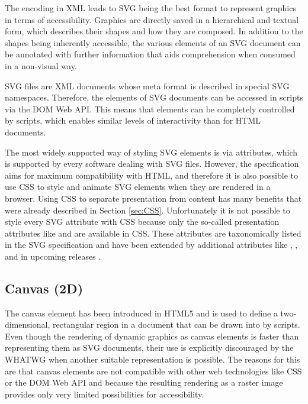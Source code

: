 The encoding in XML leads to SVG being the best format to represent graphics in terms of accessibility. 
Graphics are directly saved in a hierarchical and textual form, which describes their shapes and how they are composed. 
In addition to the shapes being inherently accessible, the various elements of an SVG document can be annotated with further information that aids comprehension when consumed in a non-visual way.

SVG files are XML documents whose meta format is described in special SVG namespaces. 
Therefore, the elements of SVG documents can be accessed in scripts via the DOM Web API. 
This means that elements can be completely controlled by scripts, which enables similar levels of interactivity than for HTML documents.

The most widely supported way of styling SVG elements is via attributes, which is supported by every software dealing with SVG files. 
However, the specification aims for maximum compatibility with HTML, and therefore it is also possible to use CSS to style and animate SVG elements when they are rendered in a browser. 
Using CSS to separate presentation from content has many benefits that were already described in Section \ref{sec:CSS}.
Unfortunately it is not possible to style every SVG attribute with CSS because only the so-called presentation attributes like  and  are available in CSS. 
These attributes are taxonomically listed in the SVG specification \parencite{SVG11} and have been extended by additional attributes like , ,  and  in upcoming releases \parencite{SVG2}.

\subsection{Canvas (2D)}
\label{sec:Canvas2D}

The canvas element has been introduced in HTML5 \parencite{HTML} and is used to define a two-dimensional, rectangular region in a document that can be drawn into by scripts.
Even though the rendering of dynamic graphics as canvas elements is faster than representing them as SVG documents, their use is explicitly discouraged by the WHATWG when another suitable representation is possible.
The reasons for this are that canvas elements are not compatible with other web technologies like CSS or the DOM Web API and because the resulting rendering as a raster image provides only very limited possibilities for accessibility.

